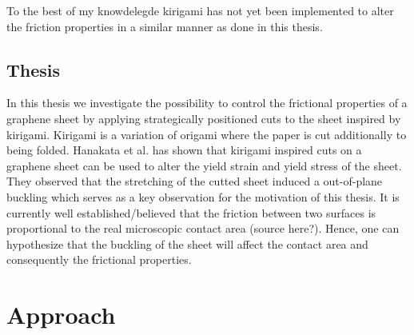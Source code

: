 




To the best of my knowdelegde kirigami has not yet been implemented to alter the friction properties in a similar manner as done in this thesis. 

\subsection{Thesis}

In this thesis we investigate the possibility to control the frictional properties of a graphene sheet by applying strategically positioned cuts to the sheet inspired by kirigami. Kirigami is a variation of origami where the paper is cut additionally to being folded. Hanakata et al. \cite{PhysRevResearch.2.042006} has shown that kirigami inspired cuts on a graphene sheet can be used to alter the yield strain and yield stress of the sheet. They observed that the stretching of the cutted sheet induced a out-of-plane buckling which serves as a key observation for the motivation of this thesis. It is currently well established/believed that the friction between two surfaces is proportional to the real microscopic contact area (source here?). Hence, one can hypothesize that the buckling of the sheet will affect the contact area and consequently the frictional properties. 





\section{Approach}

